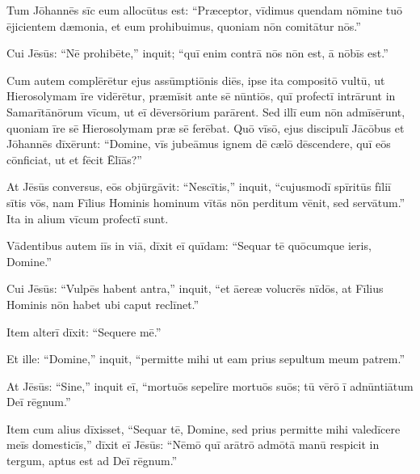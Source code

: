 \Versus Tum Jōhannēs sīc eum allocūtus est: ``Præceptor, vīdimus quendam nōmine tuō ējicientem dæmonia, et eum prohibuimus, quoniam nōn comitātur nōs.''

\Versus Cui Jēsūs: ``Nē prohibēte,'' inquit; ``quī enim contrā nōs nōn est, ā nōbīs est.''

\Versus Cum autem complērētur ejus assūmptiōnis diēs, ipse ita compositō vultū, ut Hierosolymam īre vidērētur,
\Versus præmīsit ante sē nūntiōs, quī profectī intrārunt in Samarītānōrum vīcum, ut eī dēversōrium parārent.
\Versus Sed illī eum nōn admīsērunt, quoniam īre sē Hierosolymam præ sē ferēbat.
\Versus Quō vīsō, ejus discipulī Jācōbus et Jōhannēs dīxērunt: ``Domine, vīs jubeāmus ignem dē cælō dēscendere, quī eōs cōnficiat, ut et fēcit Ēlīās?''

\Versus At Jēsūs conversus, eōs objūrgāvit: ``Nescītis,'' inquit, ``cujusmodī spīritūs fīliī sītis vōs,
\Versus nam Fīlius Hominis hominum vītās nōn perditum vēnit, sed servātum.'' Ita in alium vīcum profectī sunt.

\Versus Vādentibus autem iīs in viā, dīxit eī quīdam: ``Sequar tē quōcumque ieris, Domine.''

\Versus Cui Jēsūs: ``Vulpēs habent antra,'' inquit, ``et āereæ volucrēs nīdōs, at Fīlius Hominis nōn habet ubi caput reclīnet.''

\Versus Item alterī dīxit: ``Sequere mē.''

Et ille: ``Domine,'' inquit, ``permitte mihi ut eam prius sepultum meum patrem.''

\Versus At Jēsūs: ``Sine,'' inquit eī, ``mortuōs sepelīre mortuōs suōs; tū vērō ī adnūntiātum Deī rēgnum.''

\Versus Item cum alius dīxisset, ``Sequar tē, Domine, sed prius permitte mihi valedīcere meīs domesticīs,''
\Versus dīxit eī Jēsūs: ``Nēmō quī arātrō admōtā manū respicit in tergum, aptus est ad Deī rēgnum.''
